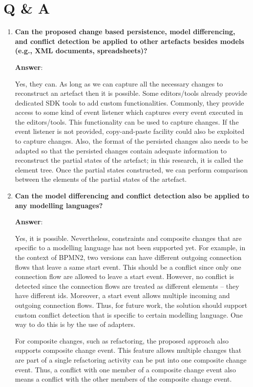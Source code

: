 \chapter{Q \& A}
\label{sec:qna}

\begin{enumerate}
  \item \textbf{Can the proposed change based persistence, model differencing, and conflict detection be applied to other artefacts besides models (e.g., XML documents, spreadsheets)?}
  
  \textbf{Answer}:
  
  Yes, they can. As long as we can capture all the necessary changes to reconstruct an artefact then it is possible. Some editors/tools already provide dedicated SDK tools to add custom functionalities.  Commonly, they provide access to some kind of event listener which captures every event executed in the editors/tools. This functionality can be used to capture changes. If the event listener is not provided, copy-and-paste facility could also be exploited to capture changes. Also, the format of the persisted changes also needs to be adapted so that the persisted changes contain adequate information to reconstruct the partial states of the artefact; in this research, it is called the element tree. Once the partial states constructed, we can perform comparison between the elements of the partial states of the artefact.
  
  \item \textbf{Can the model differencing and conflict detection also be applied to any modelling languages?}
  
  \textbf{Answer}:
  
  Yes, it is possible. Nevertheless, constraints and composite changes that are specific to a modelling language has not been supported yet. For example, in the context of BPMN2, two versions can have different outgoing connection flows that leave a same start event. This should be a conflict since only one connection flow are allowed to leave a start event. However, no conflict is detected since the connection flows are treated as different elements -- they have different ids. Moreover, a start event allows multiple incoming and outgoing connection flows. Thus, for future work, the solution should support custom conflict detection that is specific to certain modelling language. One way to do this is by the use of adapters.
  
  For composite changes, such as refactoring, the proposed approach also supports composite change event. This feature allows multiple changes that are part of a single refactoring activity can be put into one composite change event. Thus, a conflict with one member of a composite change event also means a conflict with the other members of the composite change event.
  

\end{enumerate}
